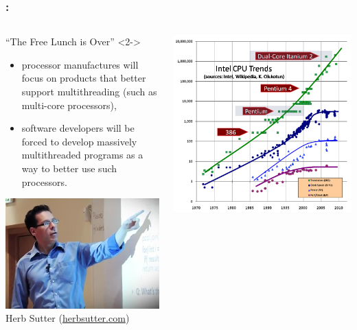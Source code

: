 \documentclass[9pt,xcolor=table]{beamer}
\begin{document}
\begin{frame}
\frametitle{\insertsectionhead{}: \insertsubsectionhead{}}
\begin{columns}[c]
  \begin{column}{.4\textwidth}
    \begin{block}{``The Free Lunch is Over'' \cite{Sutter}}<2->
        \begin{itemize}[<+->]
        \item processor manufactures will focus on products that
          better support multithreading (such as multi-core
          processors),
        \item software developers will be forced to
          develop massively multithreaded programs as a way to better
          use such processors.
        \end{itemize}
      \end{block}
      \begin{center}
        \includegraphics[width=.7\textwidth]{img/herb_sutter}\\[6pt]\small
        Herb Sutter (\href{http://herbsutter.com/about/}{herbsutter.com})
      \end{center}
    \end{column}
    \begin{column}{.575\textwidth}
      \begin{center}
        \includegraphics[width=.8\textwidth]{img/free_lunch_CPU}\\[6pt]\small

\end{center}
\end{column}
\end{columns}
\end{frame}
\end{document}
